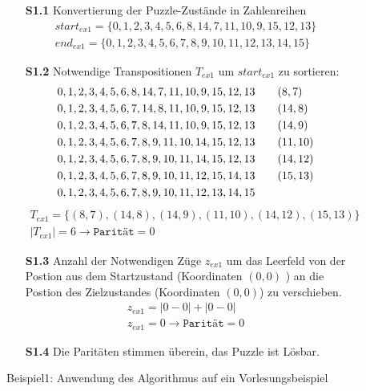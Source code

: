 \begin{figure}[H]
	\begin{enumerate}
		\item[\textbf{S1.1}] Konvertierung der Puzzle-Zustände in Zahlenreihen
		      \begin{align*}
			      start_{ex1} = \{0,1,2,3,4,5,6,8,14,7,11,10,9,15,12,13\} \\
			      end_{ex1} = \{0,1,2,3,4,5,6,7,8,9,10,11,12,13,14,15\}
		      \end{align*}
		\item[\textbf{S1.2}] Notwendige Transpositionen $T_{ex1}$ um $start_{ex1}$ zu sortieren:
		      \begin{align*}
			      0,1,2,3,4,5,6,8,14,7,11,10,9,15,12,13 & \hspace{20pt} (\space 8,\space 7) \\
			      0,1,2,3,4,5,6,7,14,8,11,10,9,15,12,13 & \hspace{20pt} (14,\space 8)       \\
			      0,1,2,3,4,5,6,7,8,14,11,10,9,15,12,13 & \hspace{20pt} (14,\space 9)       \\
			      0,1,2,3,4,5,6,7,8,9,11,10,14,15,12,13 & \hspace{20pt} (11,10)             \\
			      0,1,2,3,4,5,6,7,8,9,10,11,14,15,12,13 & \hspace{20pt} (14,12)             \\
			      0,1,2,3,4,5,6,7,8,9,10,11,12,15,14,13 & \hspace{20pt} (15,13)             \\
			      0,1,2,3,4,5,6,7,8,9,10,11,12,13,14,15 &
		      \end{align*}
		      \begin{align*}
			      T_{ex1} = \{(8,7),(14,8),(14,9),(11,10),(14,12),(15,13)\} \\
			      \left\vert T_{ex1}\right\vert = 6 \rightarrow \texttt{Parität} = 0
		      \end{align*}
		\item[\textbf{S1.3}] Anzahl der Notwendigen Züge $z_{ex1}$ um das Leerfeld von der Postion aus dem Startzustand (Koordinaten $(0,0)$ ) an die Postion des Zielzustandes (Koordinaten $(0,0)$) zu verschieben.
		      \begin{align*}
			      z_{ex1} = \left | 0 - 0 \right | + \left | 0 - 0 \right | \\
			      z_{ex1} = 0 \rightarrow \texttt{Parität} = 0
		      \end{align*}
		\item[\textbf{S1.4}] Die Paritäten stimmen überein, das Puzzle \textcolor{OliveGreen}{ist Lösbar}.
	\end{enumerate}
	\caption{Beispiel1: Anwendung des Algorithmus auf ein Vorlesungsbeispiel \label{fig:Ex1_algo}}
\end{figure}
